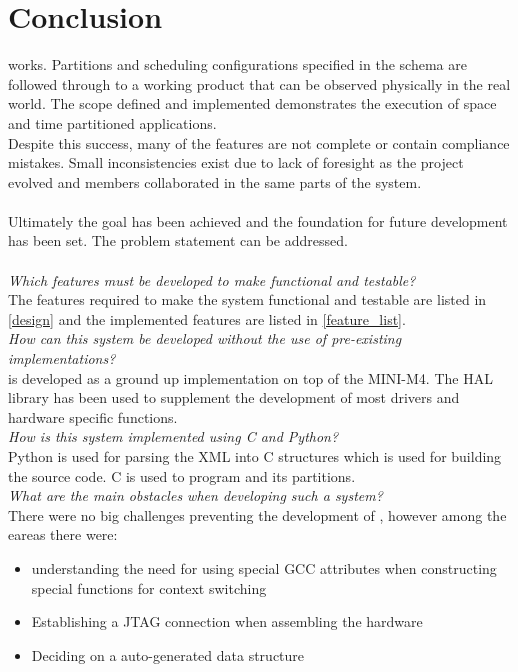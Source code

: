 \chapter{Conclusion}

\OSname{} works. 
Partitions and scheduling configurations specified 
in the schema are followed through to a working 
product that can be observed physically in the real world. 
The scope defined and implemented demonstrates the 
execution of space and time partitioned applications.
\\
Despite this success, many of the features are not 
complete or contain compliance mistakes. 
Small inconsistencies exist due to lack of foresight
as the project evolved and members collaborated 
in the same parts of the system.
\\\\
Ultimately the goal has been achieved and the 
foundation for future development has been set.
The problem statement can be addressed.
\\\\
\textit{Which features must be developed to make \OSname{} functional and
testable?}\\
The features required to make the system functional and testable are listed in \ref{design}
and the implemented features are listed in \ref{feature_list}.\\

\textit{How can this system be developed without the use of pre-existing
implementations?}\\
\OSname{} is developed as a ground up implementation on top of the MINI-M4.
The HAL library has been used to supplement the development of most drivers and hardware specific functions.\\

\textit{How is this system implemented using C and Python?}\\
Python is used for parsing the XML into C structures which is used for building the source code.
C is used to program \OSname{} and its partitions.\\

\textit{What are the main obstacles when developing such a system?}\\
There were no big challenges preventing the development of \OSname{},
however among the eareas  there were:
\begin{itemize}
	\item understanding the need for using special GCC attributes when constructing special functions for context switching
	\item Establishing a JTAG connection when assembling the hardware
	\item Deciding on a auto-generated data structure
\end{itemize}

